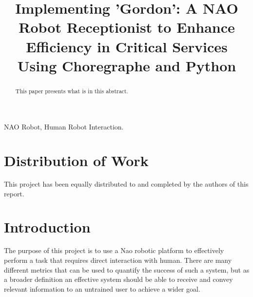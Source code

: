\documentclass[conference]{IEEEtran}
\begin{document}
\title{Implementing 'Gordon': A NAO Robot Receptionist to Enhance Efficiency in Critical Services Using Choregraphe and Python}

\author{
}

\maketitle

\begin{abstract}

This paper presents what is in this abstract. 

\end{abstract}

\begin{IEEEkeywords}

NAO Robot, Human Robot Interaction.

\end{IEEEkeywords}

\section{Distribution of Work} This project has been equally distributed to and completed by the authors of this report.

\section{Introduction}

The purpose of this project is to use a Nao robotic platform to effectively perform a task that requires direct interaction with human. 
There are many different metrics that can be used to quantify the success of such a system, but as a broader definition an effective system 
should be able to receive and convey relevant information to an untrained user to achieve a wider goal.
\end{document}

